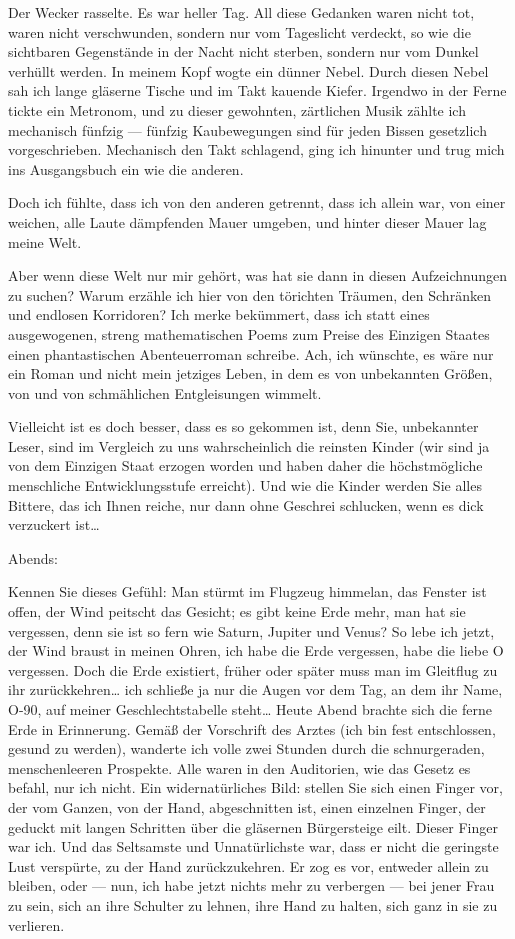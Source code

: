 Der Wecker rasselte. Es war
heller Tag. All diese Gedanken waren nicht tot, waren nicht
verschwunden, sondern nur vom Tageslicht verdeckt, so wie die
sichtbaren Gegenstände in der Nacht nicht sterben, sondern nur vom
Dunkel verhüllt werden. In meinem Kopf wogte ein dünner Nebel.
Durch diesen Nebel sah ich lange gläserne Tische und im Takt
kauende Kiefer. Irgendwo in der Ferne tickte ein Metronom, und zu
dieser gewohnten, zärtlichen Musik zählte ich mechanisch fünfzig —
fünfzig Kaubewegungen sind für jeden Bissen gesetzlich
vorgeschrieben. Mechanisch den Takt schlagend, ging ich hinunter
und trug mich ins Ausgangsbuch ein wie die anderen.

Doch ich fühlte, dass ich von den anderen getrennt, dass ich allein
war, von einer weichen, alle Laute dämpfenden Mauer umgeben, und
hinter dieser Mauer lag meine Welt.

Aber wenn diese Welt nur mir
gehört, was hat sie dann in diesen Aufzeichnungen zu suchen? Warum
erzähle ich hier von den törichten Träumen, den Schränken und
endlosen Korridoren? Ich merke bekümmert, dass ich statt eines
ausgewogenen, streng mathematischen Poems zum Preise des Einzigen
Staates einen phantastischen Abenteuerroman schreibe. Ach, ich
wünschte, es wäre nur ein Roman und nicht mein jetziges Leben, in
dem es von unbekannten Größen, von \wurzel{} und von schmählichen
Entgleisungen wimmelt.

Vielleicht ist es doch besser, dass es so gekommen ist, denn Sie,
unbekannter Leser, sind im Vergleich zu uns wahrscheinlich die
reinsten Kinder (wir sind ja von dem Einzigen Staat erzogen worden
und haben daher die höchstmögliche menschliche Entwicklungsstufe
erreicht). Und wie die Kinder werden Sie alles Bittere, das ich
Ihnen reiche, nur dann ohne Geschrei schlucken, wenn es dick
verzuckert ist\ldots{}

\bigpar
Abends:

Kennen Sie dieses Gefühl: Man stürmt im Flugzeug himmelan, das
Fenster ist offen, der Wind peitscht das Gesicht; es gibt keine
Erde mehr, man hat sie vergessen, denn sie ist so fern wie Saturn,
Jupiter und Venus? So lebe ich jetzt, der Wind braust in meinen
Ohren, ich habe die Erde vergessen, habe die liebe O vergessen.
Doch die Erde existiert, früher oder später muss man im Gleitflug
zu ihr zurückkehren\ldots{} ich schließe ja nur die Augen vor dem Tag,
an dem ihr Name, O-90, auf meiner Geschlechtstabelle steht\ldots{} Heute
Abend brachte sich die ferne Erde
in Erinnerung. Gemäß der Vorschrift des Arztes (ich bin fest
entschlossen, gesund zu werden), wanderte ich volle zwei Stunden
durch die schnurgeraden, menschenleeren Prospekte. Alle waren in
den Auditorien, wie das Gesetz es befahl, nur ich nicht. Ein
widernatürliches Bild: stellen Sie sich einen Finger vor, der vom
Ganzen, von der Hand, abgeschnitten ist, einen einzelnen Finger,
der geduckt mit langen Schritten über die gläsernen Bürgersteige
eilt. Dieser Finger war ich. Und das Seltsamste und Unnatürlichste
war, dass er nicht die geringste Lust verspürte, zu der Hand
zurückzukehren. Er zog es vor, entweder allein zu bleiben, oder —
nun, ich habe jetzt nichts mehr zu verbergen — bei jener Frau zu
sein, sich an ihre Schulter zu lehnen, ihre Hand zu halten, sich
ganz in sie zu verlieren.

